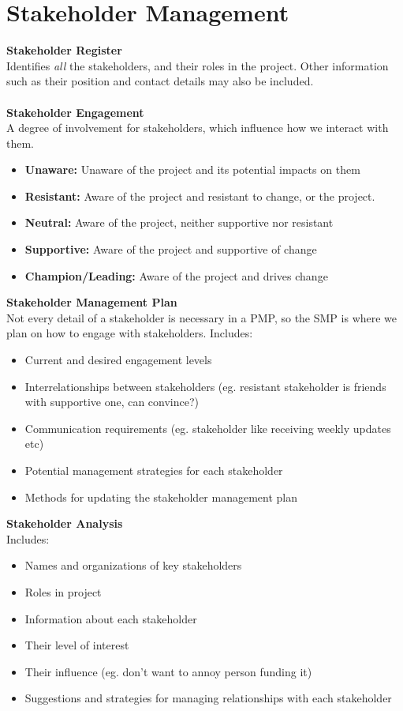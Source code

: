 \documentclass[a4paper,10pt]{article}
\begin{document}
\section*{Stakeholder Management}
\textcolor{BlueGreen}{\textbf{Stakeholder Register}}\\
Identifies \emph{all} the stakeholders, and their roles in the project. Other information such as their position and contact details may also be included. \\\\ 
\textcolor{BlueGreen}{\textbf{Stakeholder Engagement}} \\
A degree of involvement for stakeholders, which influence how we interact with them. 
\begin{itemize}
	\item \textbf{Unaware:} Unaware of the project and its potential impacts on them 
	\item \textbf{Resistant:} Aware of the project and resistant to change, or the project. 
	\item \textbf{Neutral:} Aware of the project, neither supportive nor resistant 
	\item \textbf{Supportive:} Aware of the project and supportive of change 
	\item \textbf{Champion/Leading:} Aware of the project and drives change 
\end{itemize}
\textcolor{BlueGreen}{\textbf{Stakeholder Management Plan}} \\
Not every detail of a stakeholder is necessary in a PMP, so the SMP is where we plan on how to engage with stakeholders. Includes: 
\begin{itemize}
	\item Current and desired engagement levels 
	\item Interrelationships between stakeholders (eg. resistant stakeholder is friends with supportive one, can convince?)
	\item Communication requirements (eg. stakeholder like receiving weekly updates etc)
	\item Potential management strategies for each stakeholder 
	\item Methods for updating the stakeholder management plan
\end{itemize}
\textcolor{BlueGreen}{\textbf{Stakeholder Analysis}} \\
Includes: 
\begin{itemize}
	\item Names and organizations of key stakeholders 
	\item Roles in project 
	\item Information about each stakeholder 
	\item Their level of interest 
	\item Their influence (eg. don't want to annoy person funding it)
	\item Suggestions and strategies for managing relationships with each stakeholder
\end{itemize}
\newpage
\end{document}
